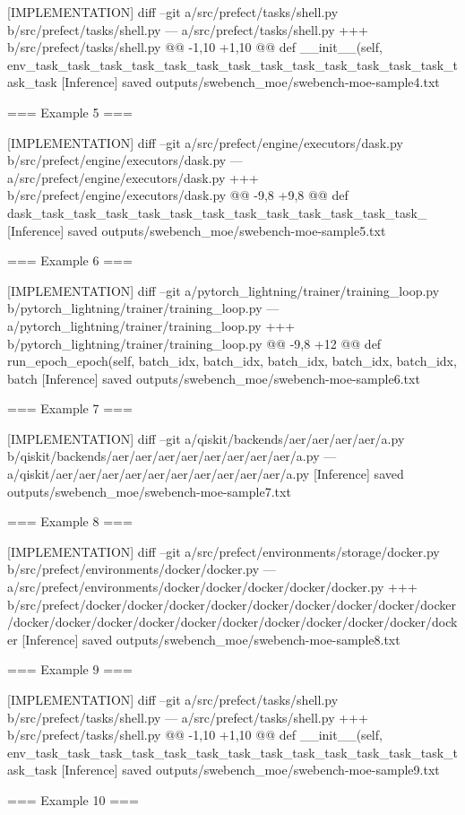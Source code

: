 [IMPLEMENTATION]
diff --git a/src/prefect/tasks/shell.py b/src/prefect/tasks/shell.py --- a/src/prefect/tasks/shell.py +++ b/src/prefect/tasks/shell.py @@ -1,10 +1,10 @@ def __init__(self, env_task_task_task_task_task_task_task_task_task_task_task_task_task_task_task
[Inference] saved outputs/swebench_moe/swebench-moe-sample4.txt

=== Example 5 ===

[IMPLEMENTATION]
diff --git a/src/prefect/engine/executors/dask.py b/src/prefect/engine/executors/dask.py --- a/src/prefect/engine/executors/dask.py +++ b/src/prefect/engine/executors/dask.py @@ -9,8 +9,8 @@ def dask_task_task_task_task_task_task_task_task_task_task_task_task_
[Inference] saved outputs/swebench_moe/swebench-moe-sample5.txt

=== Example 6 ===

[IMPLEMENTATION]
diff --git a/pytorch_lightning/trainer/training_loop.py b/pytorch_lightning/trainer/training_loop.py --- a/pytorch_lightning/trainer/training_loop.py +++ b/pytorch_lightning/trainer/training_loop.py @@ -9,8 +12 @@ def run_epoch_epoch(self, batch_idx, batch_idx, batch_idx, batch_idx, batch_idx, batch
[Inference] saved outputs/swebench_moe/swebench-moe-sample6.txt

=== Example 7 ===

[IMPLEMENTATION]
diff --git a/qiskit/backends/aer/aer/aer/aer/a.py b/qiskit/backends/aer/aer/aer/aer/aer/aer/aer/aer/a.py --- a/qiskit/aer/aer/aer/aer/aer/aer/aer/aer/aer/aer/a.py
[Inference] saved outputs/swebench_moe/swebench-moe-sample7.txt

=== Example 8 ===

[IMPLEMENTATION]
diff --git a/src/prefect/environments/storage/docker.py b/src/prefect/environments/docker/docker.py --- a/src/prefect/environments/docker/docker/docker/docker/docker.py +++ b/src/prefect/docker/docker/docker/docker/docker/docker/docker/docker/docker/docker/docker/docker/docker/docker/docker/docker/docker/docker/docker/docker
[Inference] saved outputs/swebench_moe/swebench-moe-sample8.txt

=== Example 9 ===

[IMPLEMENTATION]
diff --git a/src/prefect/tasks/shell.py b/src/prefect/tasks/shell.py --- a/src/prefect/tasks/shell.py +++ b/src/prefect/tasks/shell.py @@ -1,10 +1,10 @@ def __init__(self, env_task_task_task_task_task_task_task_task_task_task_task_task_task_task_task
[Inference] saved outputs/swebench_moe/swebench-moe-sample9.txt

=== Example 10 ===

